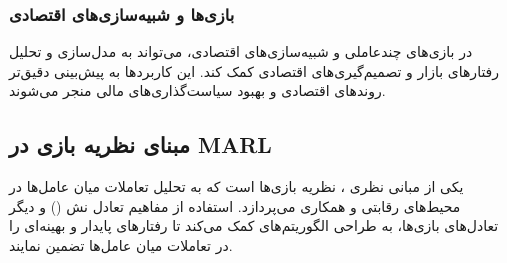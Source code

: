 \subsubsection{بازی‌ها و شبیه‌سازی‌های اقتصادی}
در بازی‌های چندعاملی و شبیه‌سازی‌های اقتصادی،  می‌تواند به مدل‌سازی و تحلیل رفتارهای بازار و تصمیم‌گیری‌های اقتصادی کمک کند. این کاربردها به پیش‌بینی دقیق‌تر روندهای اقتصادی و بهبود سیاست‌گذاری‌های مالی منجر می‌شوند.

\subsection{مبنای نظریه بازی در MARL}
یکی از مبانی نظری ، نظریه بازی‌ها است که به تحلیل تعاملات میان عامل‌ها در محیط‌های رقابتی و همکاری می‌پردازد. استفاده از مفاهیم تعادل نش () و دیگر تعادل‌های بازی‌ها، به طراحی الگوریتم‌های  کمک می‌کند تا رفتارهای پایدار و بهینه‌ای را در تعاملات میان عامل‌ها تضمین نمایند.



